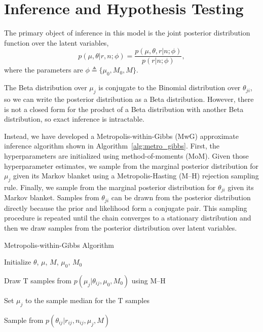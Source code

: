 \documentclass{bioinfo}
\begin{document}
\section{Inference and Hypothesis Testing}

The primary object of inference in this model is the joint posterior distribution function over the latent variables,
\begin{equation}
	p(\mu, \theta | r, n; \phi)  = \frac{ p(\mu, \theta, r | n; \phi) } {p ( r | n; \phi)},
\end{equation}
where the parameters are $\phi \triangleq \{\mu_0, M_0, M\}$.

The Beta distribution over $\mu_j$ is conjugate to the Binomial distribution over $\theta_{ji}$, so we can write the posterior distribution as a Beta distribution. However, there is not a closed form for the product of a Beta distribution with another Beta distribution, so exact inference is intractable.

Instead, we have developed a Metropolis-within-Gibbs (MwG)  approximate inference algorithm shown in Algorithm~\ref{alg:metro_gibbs}. First, the hyperparameters are initialized using method-of-moments (MoM). Given those hyperparameter estimates, we sample from the marginal posterior distribution for $\mu_j$ given its Markov blanket using a Metropolis-Hasting (M--H) rejection sampling rule. Finally, we sample from the marginal posterior distribution for $\theta_{ji}$ given its Markov blanket. Samples from $\theta_{ji}$ can be drawn from the posterior distribution directly  because the prior and likelihood form a conjugate pair. This sampling procedure is repeated until the chain converges to a stationary distribution and then we draw samples from the posterior distribution over latent variables.

\begin{algorithm}[ht]
  \caption{Metropolis-within-Gibbs Algorithm}
  \label{alg:metro_gibbs}
  \begin{algorithmic}[1]

  \State Initialize $\theta$, $\mu$, $M$, $\mu_0$, $M_0$

  \Repeat


    \State Draw T samples from $p \left( \mu_j |\theta_{ij},\mu_0,M_0\right)$ using M--H 

    \State Set $\mu_j$ to the sample median for the T samples


	\State Sample from $p \left( \theta_{ij} |r_{ij},n_{ij},\mu_j,M \right)$
	
      \EndFor

    \EndFor


  \end{algorithmic}
\end{algorithm}
\end{document}
